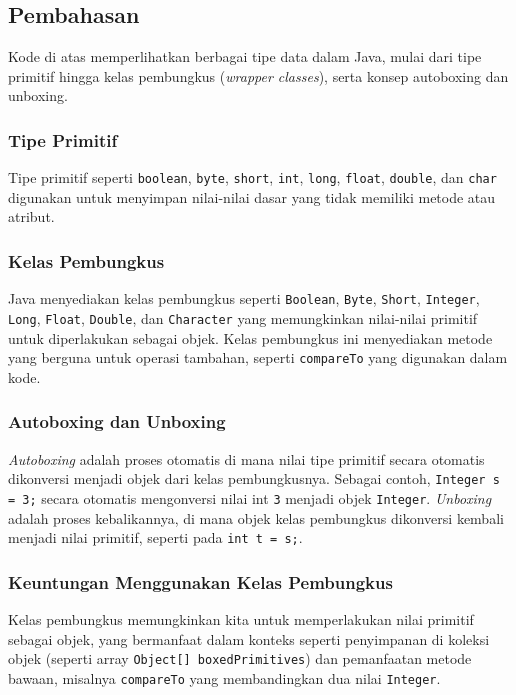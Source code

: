 \subsection{Pembahasan}
Kode di atas memperlihatkan berbagai tipe data dalam Java, mulai dari tipe primitif hingga kelas pembungkus (\textit{wrapper classes}), serta konsep autoboxing dan unboxing.

\subsubsection{Tipe Primitif}
Tipe primitif seperti \texttt{boolean}, \texttt{byte}, \texttt{short}, \texttt{int}, \texttt{long}, \texttt{float}, \texttt{double}, dan \texttt{char} digunakan untuk menyimpan nilai-nilai dasar yang tidak memiliki metode atau atribut.

\subsubsection{Kelas Pembungkus}
Java menyediakan kelas pembungkus seperti \texttt{Boolean}, \texttt{Byte}, \texttt{Short}, \texttt{Integer}, \texttt{Long}, \texttt{Float}, \texttt{Double}, dan \texttt{Character} yang memungkinkan nilai-nilai primitif untuk diperlakukan sebagai objek. Kelas pembungkus ini menyediakan metode yang berguna untuk operasi tambahan, seperti \texttt{compareTo} yang digunakan dalam kode.

\subsubsection{Autoboxing dan Unboxing}
\textit{Autoboxing} adalah proses otomatis di mana nilai tipe primitif secara otomatis dikonversi menjadi objek dari kelas pembungkusnya. Sebagai contoh, \texttt{Integer s = 3;} secara otomatis mengonversi nilai int \texttt{3} menjadi objek \texttt{Integer}. \textit{Unboxing} adalah proses kebalikannya, di mana objek kelas pembungkus dikonversi kembali menjadi nilai primitif, seperti pada \texttt{int t = s;}.

\subsubsection{Keuntungan Menggunakan Kelas Pembungkus}
Kelas pembungkus memungkinkan kita untuk memperlakukan nilai primitif sebagai objek, yang bermanfaat dalam konteks seperti penyimpanan di koleksi objek (seperti array \texttt{Object[] boxedPrimitives}) dan pemanfaatan metode bawaan, misalnya \texttt{compareTo} yang membandingkan dua nilai \texttt{Integer}.

